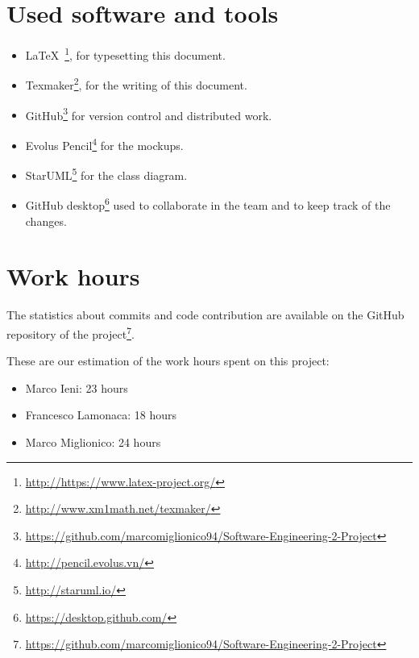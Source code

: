 \section{Used software and tools}
\begin{itemize}
    \item \LaTeX\ \footnote{\url{http://https://www.latex-project.org/}}, for typesetting this document.
    \item Texmaker\footnote{\url{http://www.xm1math.net/texmaker/}}, for the writing of this document.
    \item GitHub\footnote{\url{https://github.com/marcomiglionico94/Software-Engineering-2-Project}} for version control and distributed work.
    \item Evolus Pencil\footnote{\url{http://pencil.evolus.vn/}} for the mockups.
    \item StarUML\footnote{\url{http://staruml.io/}} for the class diagram.
    \item GitHub desktop\footnote{\url{https://desktop.github.com/}} used to collaborate in the team and to keep track of the changes. 
\end{itemize}

\section{Work hours}
The statistics about commits and code contribution are available on the GitHub repository of the project\footnote{\url{https://github.com/marcomiglionico94/Software-Engineering-2-Project}}.

These are our estimation of the work hours spent on this project:
\begin{itemize}
    \item Marco Ieni: 23 hours
    \item Francesco Lamonaca: 18 hours
    \item Marco Miglionico: 24 hours
\end{itemize}
